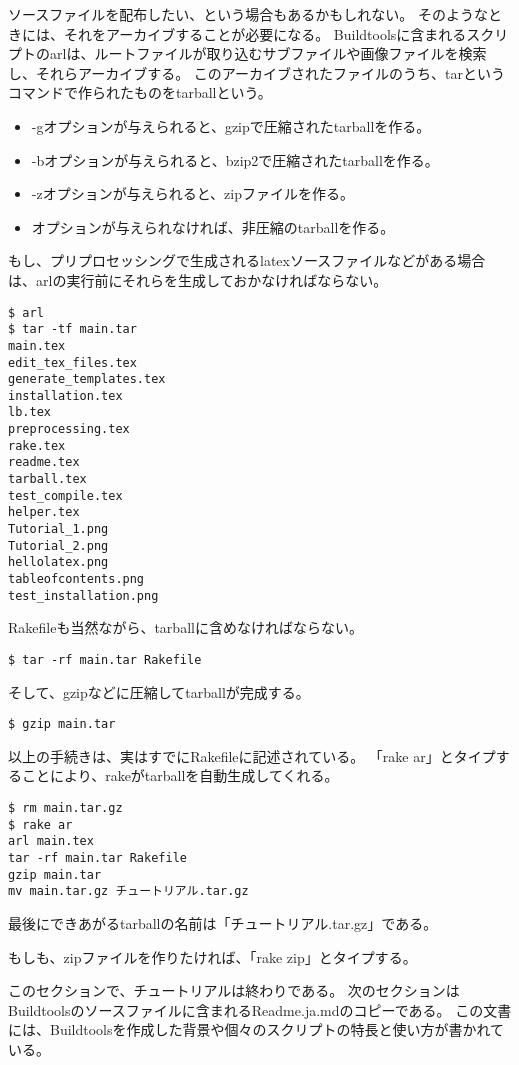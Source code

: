 ソースファイルを配布したい、という場合もあるかもしれない。
そのようなときには、それをアーカイブすることが必要になる。
Buildtoolsに含まれるスクリプトのarlは、ルートファイルが取り込むサブファイルや画像ファイルを検索し、それらアーカイブする。
このアーカイブされたファイルのうち、tarというコマンドで作られたものをtarballという。
\begin{itemize}
\item -gオプションが与えられると、gzipで圧縮されたtarballを作る。
\item -bオプションが与えられると、bzip2で圧縮されたtarballを作る。
\item -zオプションが与えられると、zipファイルを作る。
\item オプションが与えられなければ、非圧縮のtarballを作る。
\end{itemize}

もし、プリプロセッシングで生成されるlatexソースファイルなどがある場合は、arlの実行前にそれらを生成しておかなければならない。
\begin{verbatim}
$ arl
$ tar -tf main.tar
main.tex
edit_tex_files.tex
generate_templates.tex
installation.tex
lb.tex
preprocessing.tex
rake.tex
readme.tex
tarball.tex
test_compile.tex
helper.tex
Tutorial_1.png
Tutorial_2.png
hellolatex.png
tableofcontents.png
test_installation.png
\end{verbatim}

Rakefileも当然ながら、tarballに含めなければならない。
\begin{verbatim}
$ tar -rf main.tar Rakefile
\end{verbatim}
そして、gzipなどに圧縮してtarballが完成する。
\begin{verbatim}
$ gzip main.tar
\end{verbatim}

以上の手続きは、実はすでにRakefileに記述されている。
「rake ar」とタイプすることにより、rakeがtarballを自動生成してくれる。
\begin{verbatim}
$ rm main.tar.gz
$ rake ar
arl main.tex
tar -rf main.tar Rakefile
gzip main.tar
mv main.tar.gz チュートリアル.tar.gz
\end{verbatim}
最後にできあがるtarballの名前は「チュートリアル.tar.gz」である。

もしも、zipファイルを作りたければ、「rake zip」とタイプする。

このセクションで、チュートリアルは終わりである。
次のセクションはBuildtoolsのソースファイルに含まれるReadme.ja.mdのコピーである。
この文書には、Buildtoolsを作成した背景や個々のスクリプトの特長と使い方が書かれている。

